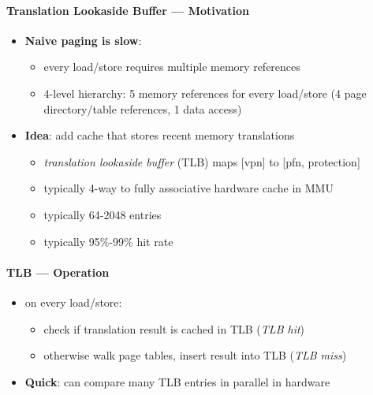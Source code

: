 \paragraph{Translation Lookaside Buffer --- Motivation}
\begin{itemize}
  \item \textbf{Naive paging is slow}:
  \begin{itemize}
    \item every load/store requires multiple memory references
    \item 4-level hierarchy: 5 memory references for every load/store (4 page directory/table references, 1 data access)
  \end{itemize}
  \item \textbf{Idea}: add cache that stores recent memory translations
  \begin{itemize}
    \item \emph{translation lookaside buffer} (TLB) maps [vpn] to [pfn, protection]
    \item typically 4-way to fully associative hardware cache in MMU
    \item typically 64-2048 entries
    \item typically 95\%-99\% hit rate
  \end{itemize}
\end{itemize}

\paragraph{TLB --- Operation}
\begin{itemize}
  \item on every load/store:
  \begin{itemize}
    \item check if translation result is cached in TLB (\emph{TLB hit})
    \item otherwise walk page tables, insert result into TLB (\emph{TLB miss})
  \end{itemize}
  \item \textbf{Quick}: can compare many TLB entries in parallel in hardware
\end{itemize}

